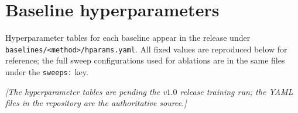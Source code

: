 \section{Baseline hyperparameters}
\label{sec:appendix:hyperparams}

Hyperparameter tables for each baseline appear in the release
under \texttt{baselines/<method>/hparams.yaml}.  All fixed values
are reproduced below for reference; the full sweep configurations
used for ablations are in the same files under the
\texttt{sweeps:} key.

\textit{[The hyperparameter tables are pending the v$1.0$ release
training run; the YAML files in the repository are the
authoritative source.]}
